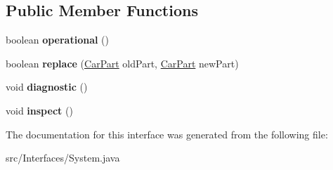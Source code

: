 \subsection*{Public Member Functions}
\begin{DoxyCompactItemize}
\item 
\hypertarget{interfaceInterfaces_1_1System_af4a4d024fc8d9ce772155f77b3362044}{}boolean {\bfseries operational} ()\label{interfaceInterfaces_1_1System_af4a4d024fc8d9ce772155f77b3362044}

\item 
\hypertarget{interfaceInterfaces_1_1System_abd08a456c6923198bcb3e735c7659060}{}boolean {\bfseries replace} (\hyperlink{classCars_1_1CarPart}{Car\+Part} old\+Part, \hyperlink{classCars_1_1CarPart}{Car\+Part} new\+Part)\label{interfaceInterfaces_1_1System_abd08a456c6923198bcb3e735c7659060}

\item 
\hypertarget{interfaceInterfaces_1_1System_a381d3a9ef08fdb1a448c70435ccca296}{}void {\bfseries diagnostic} ()\label{interfaceInterfaces_1_1System_a381d3a9ef08fdb1a448c70435ccca296}

\item 
\hypertarget{interfaceInterfaces_1_1System_a51756be35139aca6f384b4149f62f3f0}{}void {\bfseries inspect} ()\label{interfaceInterfaces_1_1System_a51756be35139aca6f384b4149f62f3f0}

\end{DoxyCompactItemize}


The documentation for this interface was generated from the following file\+:\begin{DoxyCompactItemize}
\item 
src/\+Interfaces/System.\+java\end{DoxyCompactItemize}
